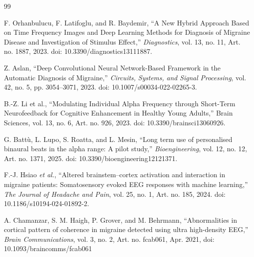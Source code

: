 \documentclass[12pt, a4paper]{report}
\begin{document}
\begin{thebibliography}{99}
\setlength{\itemsep}{0.2ex}
\setlength{\parskip}{0pt}

F. Orhanbulucu, F. Latifoglu, and R. Baydemir, ``A New Hybrid Approach Based on Time Frequency Images and Deep Learning Methods for Diagnosis of Migraine Disease and Investigation of Stimulus Effect,'' \textit{Diagnostics}, vol. 13, no. 11, Art. no. 1887, 2023. doi: 10.3390/diagnostics13111887.

Z. Aslan, ``Deep Convolutional Neural Network-Based Framework in the Automatic Diagnosis of Migraine,'' \textit{Circuits, Systems, and Signal Processing}, vol. 42, no. 5, pp. 3054--3071, 2023. doi: 10.1007/s00034-022-02265-3.

B.-Z. Li et al., “Modulating Individual Alpha Frequency through Short-Term Neurofeedback for Cognitive Enhancement in Healthy Young Adults,” Brain Sciences, vol. 13, no. 6, Art. no. 926, 2023. doi: 10.3390/brainsci13060926.

G. Batt\`u, L. Lupo, S. Roatta, and L. Mesin, ``Long term use of personalised binaural beats in the alpha range: A pilot study,'' \textit{Bioengineering}, vol. 12, no. 12, Art. no. 1371, 2025. doi: 10.3390/bioengineering12121371.

F.-J. Hsiao \textit{et al.}, ``Altered brainstem--cortex activation and interaction in migraine patients: Somatosensory evoked EEG responses with machine learning,'' \textit{The Journal of Headache and Pain}, vol. 25, no. 1, Art. no. 185, 2024. doi: 10.1186/s10194-024-01892-2.


A. Chamanzar, S. M. Haigh, P. Grover, and M. Behrmann, ``Abnormalities in cortical pattern of coherence in migraine detected using ultra high-density EEG,'' \textit{Brain Communications}, vol. 3, no. 2, Art. no. fcab061, Apr. 2021, doi: 10.1093/braincomms/fcab061
    

\end{thebibliography}
\end{document}

